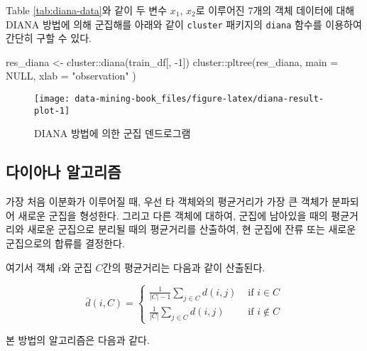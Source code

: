 \documentclass[
]{book}
\newenvironment{Shaded}{\begin{snugshade}}{\end{snugshade}}
\newcommand{\AttributeTok}[1]{\textcolor[rgb]{0.77,0.63,0.00}{#1}}
\newcommand{\ConstantTok}[1]{\textcolor[rgb]{0.00,0.00,0.00}{#1}}
\newcommand{\DecValTok}[1]{\textcolor[rgb]{0.00,0.00,0.81}{#1}}
\newcommand{\FunctionTok}[1]{\textcolor[rgb]{0.00,0.00,0.00}{#1}}
\newcommand{\NormalTok}[1]{#1}
\newcommand{\OtherTok}[1]{\textcolor[rgb]{0.56,0.35,0.01}{#1}}
\newcommand{\SpecialCharTok}[1]{\textcolor[rgb]{0.00,0.00,0.00}{#1}}
\newcommand{\StringTok}[1]{\textcolor[rgb]{0.31,0.60,0.02}{#1}}
\begin{document}
Table \ref{tab:diana-data}와 같이 두 변수 \(x_1\), \(x_2\)로 이루어진 7개의 객체 데이터에 대해 DIANA 방법에 의해 군집해를 아래와 같이 \texttt{cluster} 패키지의 \texttt{diana} 함수를 이용하여 간단히 구할 수 있다.

\begin{Shaded}
\begin{Highlighting}[]
\NormalTok{res\_diana }\OtherTok{\textless{}{-}}\NormalTok{ cluster}\SpecialCharTok{::}\FunctionTok{diana}\NormalTok{(train\_df[, }\SpecialCharTok{{-}}\DecValTok{1}\NormalTok{])}
\NormalTok{cluster}\SpecialCharTok{::}\FunctionTok{pltree}\NormalTok{(res\_diana,}
                \AttributeTok{main =} \ConstantTok{NULL}\NormalTok{,}
                \AttributeTok{xlab =} \StringTok{"observation"}
\NormalTok{                )}
\end{Highlighting}
\end{Shaded}

\begin{figure}

{\centering \texttt{[image: data-mining-book\_files/figure-latex/diana-result-plot-1]} 

}

\caption{DIANA 방법에 의한 군집 덴드로그램}\label{fig:diana-result-plot}
\end{figure}

\hypertarget{diana-algorithm}{%
\subsection{다이아나 알고리즘}\label{diana-algorithm}}

가장 처음 이분화가 이루어질 때, 우선 타 객체와의 평균거리가 가장 큰 객체가 분파되어 새로운 군집을 형성한다. 그리고 다른 객체에 대하여, 군집에 남아있을 때의 평균거리와 새로운 군집으로 분리될 때의 평균거리를 산출하여, 현 군집에 잔류 또는 새로운 군집으로의 합류를 결정한다.

여기서 객체 \(i\)와 군집 \(C\)간의 평균거리는 다음과 같이 산출된다.

\begin{equation*}
\bar{d}(i, C) = \begin{cases}
\frac{1}{|C| - 1} \sum_{j \in C} d(i, j) & \text{ if } i \in C\\
\frac{1}{|C|} \sum_{j \in C} d(i, j) & \text{ if } i \notin C
\end{cases}
\end{equation*}

본 방법의 알고리즘은 다음과 같다.
\end{document}
